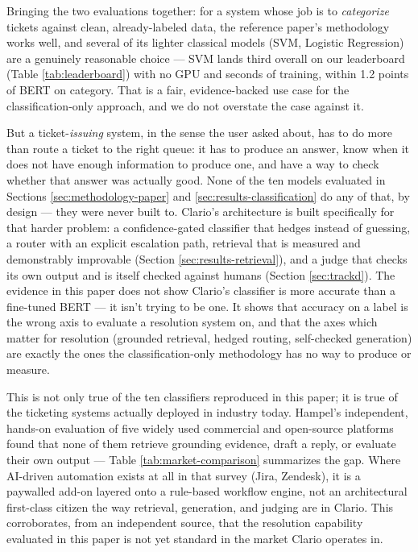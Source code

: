 \documentclass[conference]{IEEEtran}
\begin{document}
Bringing the two evaluations together: for a system whose job is to \emph{categorize} tickets against clean, already-labeled data, the reference paper's methodology works well, and several of its lighter classical models (SVM, Logistic Regression) are a genuinely reasonable choice --- SVM lands third overall on our leaderboard (Table \ref{tab:leaderboard}) with no GPU and seconds of training, within 1.2 points of BERT on category. That is a fair, evidence-backed use case for the classification-only approach, and we do not overstate the case against it.

But a ticket-\emph{issuing} system, in the sense the user asked about, has to do more than route a ticket to the right queue: it has to produce an answer, know when it does not have enough information to produce one, and have a way to check whether that answer was actually good. None of the ten models evaluated in Sections \ref{sec:methodology-paper} and \ref{sec:results-classification} do any of that, by design --- they were never built to. Clario's architecture is built specifically for that harder problem: a confidence-gated classifier that hedges instead of guessing, a router with an explicit escalation path, retrieval that is measured and demonstrably improvable (Section \ref{sec:results-retrieval}), and a judge that checks its own output and is itself checked against humans (Section \ref{sec:trackd}). The evidence in this paper does not show Clario's classifier is more accurate than a fine-tuned BERT --- it isn't trying to be one. It shows that accuracy on a label is the wrong axis to evaluate a resolution system on, and that the axes which matter for resolution (grounded retrieval, hedged routing, self-checked generation) are exactly the ones the classification-only methodology has no way to produce or measure.

This is not only true of the ten classifiers reproduced in this paper; it is true of the ticketing systems actually deployed in industry today. Hampel's independent, hands-on evaluation of five widely used commercial and open-source platforms \cite{hampel2024} found that none of them retrieve grounding evidence, draft a reply, or evaluate their own output --- Table \ref{tab:market-comparison} summarizes the gap. Where AI-driven automation exists at all in that survey (Jira, Zendesk), it is a paywalled add-on layered onto a rule-based workflow engine, not an architectural first-class citizen the way retrieval, generation, and judging are in Clario. This corroborates, from an independent source, that the resolution capability evaluated in this paper is not yet standard in the market Clario operates in.
\end{document}
